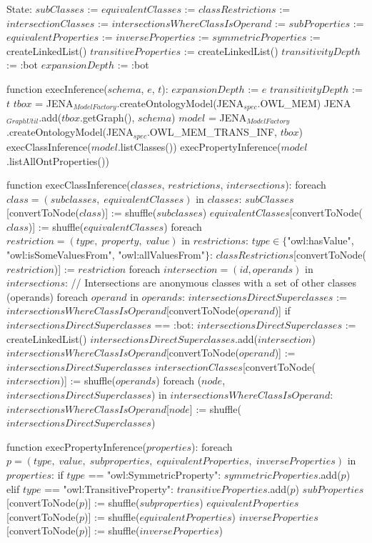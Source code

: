 State:
    $subClasses$ := {}
    $equivalentClasses$ := {}
    $classRestrictions$ := {}
    $intersectionClasses$ := {}
    $intersectionsWhereClassIsOperand$ := {}
    $subProperties$ := {}
    $equivalentProperties$ := {}
    $inverseProperties$ := {}
    $symmetricProperties$ := createLinkedList()
    $transitiveProperties$ := createLinkedList()
    $transitivityDepth$ := :bot
    $expansionDepth$ := :bot

function execInference($schema$, $e$, $t$):
    $expansionDepth$ := $e$
    $transitivityDepth$ := $t$
    $tbox$ = JENA$_{ModelFactory}$.createOntologyModel(JENA$_{spec}$.OWL_MEM)
    JENA$_{GraphUtil}$.add($tbox$.getGraph(), $schema$)
    $model$ = JENA$_{ModelFactory}$.createOntologyModel(JENA$_{spec}$.OWL_MEM_TRANS_INF, $tbox$)
    execClassInference($model$.listClasses())
    execPropertyInference($model$.listAllOntProperties())

function execClassInference($classes$, $restrictions$, $intersections$):
    foreach $class = (subclasses, \; equivalentClasses)$ in $classes$:
        $subClasses$[convertToNode($class$)] := shuffle($subclasses$)
        $equivalentClasses$[convertToNode($class$)] := shuffle($equivalentClasses$)
    foreach $restriction = (type, \; property, \; value)$ in $restrictions$:
        $type \in \{$"owl:hasValue", "owl:isSomeValuesFrom", "owl:allValuesFrom"$\}$:
            $classRestrictions$[convertToNode($restriction$)] := $restriction$
    foreach $intersection = (id, operands)$ in $intersections$: // Intersections are anonymous classes with a set of other classes (operands)
        foreach $operand$ in $operands$:
            $intersectionsDirectSuperclasses$ := $intersectionsWhereClassIsOperand$[convertToNode($operand$)]
            if $intersectionsDirectSuperclasses$ == :bot:
                $intersectionsDirectSuperclasses$ := createLinkedList()
            $intersectionsDirectSuperclasses$.add($intersection$)
            $intersectionsWhereClassIsOperand$[convertToNode($operand$)] := $intersectionsDirectSuperclasses$
        $intersectionClasses$[convertToNode($intersection$)] := shuffle($operands$)
    foreach ($node$, $intersectionsDirectSuperclasses$) in $intersectionsWhereClassIsOperand$:
        $intersectionsWhereClassIsOperand$[$node$] := shuffle($intersectionsDirectSuperclasses$)        

function execPropertyInference($properties$):
    foreach $p = (type, \; value, \; subproperties, \; equivalentProperties, \; inverseProperties)$ in $properties$:
        if $type$ == "owl:SymmetricProperty":
            $symmetricProperties$.add($p$)
        elif $type$ == "owl:TransitiveProperty":
            $transitiveProperties$.add($p$)
        $subProperties$[convertToNode($p$)] := shuffle($subproperties$)
        $equivalentProperties$[convertToNode($p$)] := shuffle($equivalentProperties$)
        $inverseProperties$[convertToNode($p$)] := shuffle($inverseProperties$)

